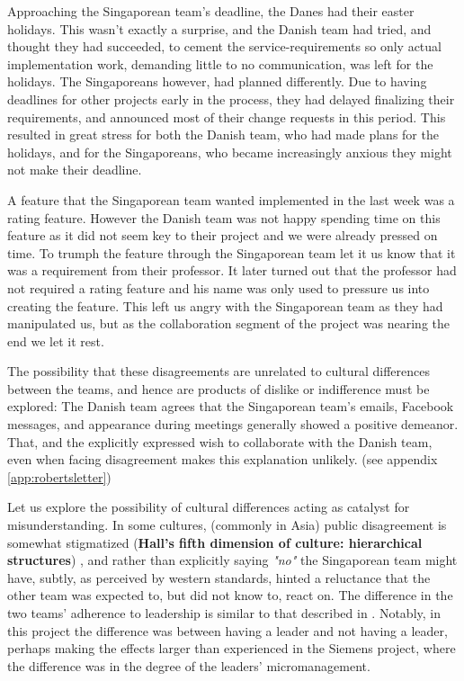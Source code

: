 Approaching the Singaporean team's deadline, the Danes had their easter
holidays. This wasn't exactly a surprise, and the Danish team had tried, and
thought they had succeeded, to cement the service-requirements so only actual
implementation work, demanding little to no communication, was left for the
holidays. The Singaporeans however, had planned differently. Due to having
deadlines for other projects early in the process, they had delayed finalizing
their requirements, and announced most of their change requests in this period.
This resulted in great stress for both the Danish team, who had made plans for
the holidays, and for the Singaporeans, who became increasingly anxious they
might not make their deadline.

A feature that the Singaporean team wanted implemented in the last week was
a rating feature. However the Danish team was not happy spending time on this
feature as it did not seem key to their project and we were already pressed on 
time. To trumph the feature through the Singaporean team let it us know
that it was a requirement from their professor. It later turned out that the
professor had not required a rating feature and  his name was only used
to pressure us into creating the feature. This left us angry with the 
Singaporean team as they had manipulated us, but as the collaboration
segment of the project was nearing the end we let it rest.

The possibility that these disagreements are unrelated to cultural differences
between the teams, and hence are products of dislike or indifference must be
explored: The Danish team agrees that the Singaporean team's emails, Facebook
messages, and appearance during meetings generally showed a positive demeanor.
That, and the explicitly expressed wish to collaborate with the Danish team,
even when facing disagreement makes this explanation unlikely. (see appendix
\ref{app:robertsletter})

Let us explore the possibility of cultural differences acting as catalyst for
misunderstanding. In some cultures, (commonly in Asia) public disagreement is
somewhat stigmatized (\textbf{Hall's fifth dimension of culture: hierarchical
structures}) \cite{surprises}\cite{herbsiemens}, and rather
than explicitly saying \emph{"no"} the Singaporean team might have, subtly, as
perceived by western standards, hinted a reluctance that the other team was
expected to, but did not know to, react on.
The difference in the two teams' adherence to leadership is similar to that
described in \cite{herbsiemens}. Notably, in this project the difference was
between having a leader and not having a leader, perhaps making the effects
larger than experienced in the Siemens project, where the difference was in the
degree of  the leaders' micromanagement.


